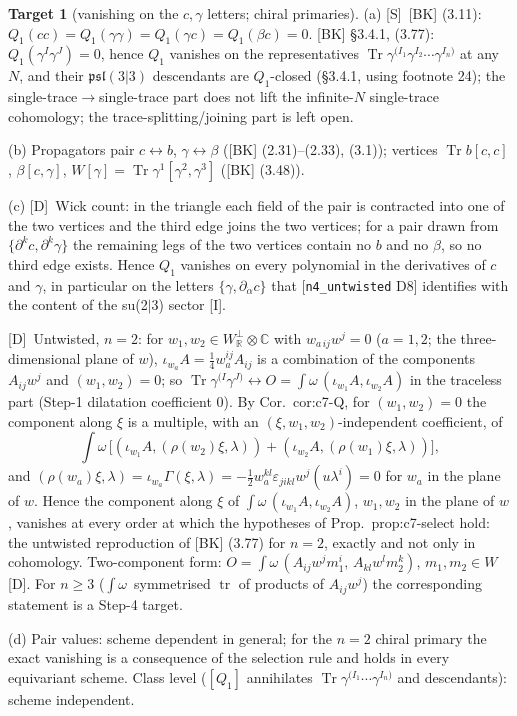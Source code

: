 \documentclass[11pt]{article}
\theoremstyle{definition}
\newtheorem{target}{Target}
\newcommand{\Tr}{\operatorname{Tr}}
\newcommand{\tr}{\operatorname{tr}}
\newcommand{\Sl}{\textup{[S]}}
\newcommand{\Dl}{\textup{[D]}}
\newcommand{\Il}{\textup{[I]}}
\begin{document}
\begin{target}[vanishing on the $c,\gamma$ letters; chiral primaries]\label{t:cgamma}
(a) \Sl\ [BK] (3.11): $Q_1(cc)=Q_1(\gamma\gamma)=Q_1(\gamma c)=Q_1(\beta c)=0$. [BK] \S3.4.1, (3.77): $Q_1(\gamma^I\gamma^J)=0$, hence $Q_1$ vanishes on the representatives $\Tr\gamma^{(I_1}\gamma^{I_2}\cdots\gamma^{I_n)}$ at any $N$, and their $\mathfrak{psl}(3|3)$ descendants are $Q_1$-closed (\S3.4.1, using footnote 24); the single-trace$\to$single-trace part does not lift the infinite-$N$ single-trace cohomology; the trace-splitting/joining part is left open.

(b) Propagators pair $c\leftrightarrow b$, $\gamma\leftrightarrow\beta$ ([BK] (2.31)--(2.33), (3.1)); vertices $\Tr b[c,c]$, $\beta[c,\gamma]$, $W[\gamma]=\Tr\gamma^1[\gamma^2,\gamma^3]$ ([BK] (3.48)).

(c) \Dl\ Wick count: in the triangle each field of the pair is contracted into one of the two vertices and the third edge joins the two vertices; for a pair drawn from $\{\partial^kc,\partial^k\gamma\}$ the remaining legs of the two vertices contain no $b$ and no $\beta$, so no third edge exists. Hence $Q_1$ vanishes on every polynomial in the derivatives of $c$ and $\gamma$, in particular on the letters $\{\gamma,\partial_{\dot\alpha}c\}$ that [\texttt{n4\_untwisted} D8] identifies with the content of the su(2$|$3) sector \Il.

\Dl\ Untwisted, $n=2$: for $w_1,w_2\in W^\perp_{\mathbb R}\otimes\mathbb C$ with $w_{a\,ij}w^j=0$ ($a=1,2$; the three-dimensional plane of $w$), $\iota_{w_a}A=\tfrac14w_a^{ij}A_{ij}$ is a combination of the components $A_{ij}w^j$ and $(w_1,w_2)=0$; so $\Tr\gamma^{(I}\gamma^{J)}\leftrightarrow O=\int\omega\,(\iota_{w_1}A,\iota_{w_2}A)$ in the traceless part (Step-1 dilatation coefficient $0$). By Cor.~cor:c7-Q, for $(w_1,w_2)=0$ the component along $\xi$ is a multiple, with an $(\xi,w_1,w_2)$-independent coefficient, of
\[
\int\omega\,\Big[(\iota_{w_1}A,(\rho(w_2)\xi,\lambda))+(\iota_{w_2}A,(\rho(w_1)\xi,\lambda))\Big],
\]
and $(\rho(w_a)\xi,\lambda)=\iota_{w_a}\Gamma(\xi,\lambda)=-\tfrac12w_a^{kl}\varepsilon_{jikl}w^j(u\lambda^i)=0$ for $w_a$ in the plane of $w$. Hence the component along $\xi$ of $\int\omega\,(\iota_{w_1}A,\iota_{w_2}A)$, $w_1,w_2$ in the plane of $w$, vanishes at every order at which the hypotheses of Prop.~prop:c7-select hold: the untwisted reproduction of [BK] (3.77) for $n=2$, exactly and not only in cohomology. Two-component form: $O=\int\omega\,(A_{ij}w^jm_1^i,\,A_{kl}w^lm_2^k)$, $m_1,m_2\in W$ \Dl. For $n\ge3$ ($\int\omega\,$ symmetrised $\tr$ of products of $A_{ij}w^j$) the corresponding statement is a Step-4 target.

(d) Pair values: scheme dependent in general; for the $n=2$ chiral primary the exact vanishing is a consequence of the selection rule and holds in every equivariant scheme. Class level ($[Q_1]$ annihilates $\Tr\gamma^{(I_1}\cdots\gamma^{I_n)}$ and descendants): scheme independent.
\end{target}
\end{document}
